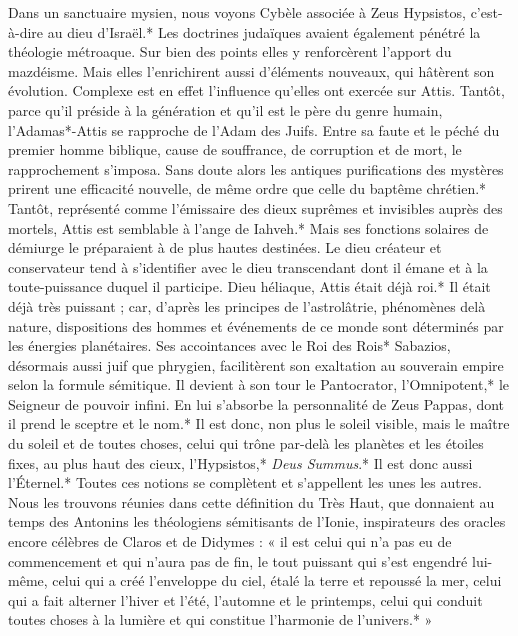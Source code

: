 \documentclass[a4paper, 11pt, oneside, polutonikogreek, french]{article}
\begin{document}
Dans un sanctuaire mysien, nous voyons Cybèle associée à Zeus Hypsistos, c'est-à-dire au dieu d'Israël.* Les doctrines judaïques avaient également pénétré la théologie métroaque. Sur bien des points elles y renforcèrent l'apport du mazdéisme. Mais elles l'enrichirent aussi d'éléments nouveaux, qui hâtèrent son évolution. Complexe est en effet l'influence qu'elles ont exercée sur Attis. Tantôt, parce qu'il préside à la génération et qu'il est le père du genre humain, l'Adamas*-Attis se rapproche de l'Adam des Juifs. Entre sa faute et le péché du premier homme biblique, cause de souffrance, de corruption et de mort, le rapprochement s'imposa. Sans doute alors les antiques purifications des mystères prirent une efficacité nouvelle, de même ordre que celle du baptême chrétien.* Tantôt, représenté comme l'émissaire des dieux suprêmes et invisibles auprès des mortels, Attis est semblable à l'ange de Iahveh.* Mais ses fonctions solaires de démiurge le préparaient à de plus hautes destinées. Le dieu créateur et conservateur tend à s'identifier avec le dieu transcendant dont il émane et à la toute-puissance duquel il participe. Dieu héliaque, Attis était déjà roi.* Il était déjà très puissant ; car, d'après les principes de l'astrolâtrie, phénomènes delà nature, dispositions des hommes et événements de ce monde sont déterminés par les énergies planétaires. Ses accointances avec le Roi des Rois* Sabazios, désormais aussi juif que phrygien, facilitèrent son exaltation au souverain empire selon la formule sémitique. Il devient à son tour le Pantocrator, l'Omnipotent,* le Seigneur de pouvoir infini. En lui s'absorbe la personnalité de Zeus Pappas, dont il prend le sceptre et le nom.* Il est donc, non plus le soleil visible, mais le maître du soleil et de toutes choses, celui qui trône par-delà les planètes et les étoiles fixes, au plus haut des cieux, l'Hypsistos,* \emph{Deus Summus}.* Il est donc aussi l'Éternel.* Toutes ces notions se complètent et s'appellent les unes les autres. Nous les trouvons réunies dans cette définition du Très Haut, que donnaient au temps des Antonins les théologiens sémitisants de l'Ionie, inspirateurs des oracles encore célèbres de Claros et de Didymes : « il est celui qui n'a pas eu de commencement et qui n'aura pas de fin, le tout puissant qui s'est engendré lui-même, celui qui a créé l'enveloppe du ciel, étalé la terre et repoussé la mer, celui qui a fait alterner l'hiver et l'été, l'automne et le printemps, celui qui conduit toutes choses à la lumière et qui constitue l'harmonie de l'univers.* »
\end{document}
